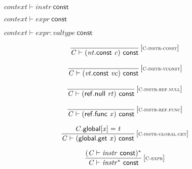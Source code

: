 \vspace{1ex}

$\boxed{{\mathit{context}} \vdash {\mathit{instr}}~\mathsf{const}}$

$\boxed{{\mathit{context}} \vdash {\mathit{expr}}~\mathsf{const}}$

$\boxed{{\mathit{context}} \vdash {\mathit{expr}} : {\mathit{valtype}}~\mathsf{const}}$

$$
\begin{array}{@{}c@{}}\displaystyle
\frac{
}{
{\mathit{C}} \vdash ({\mathit{nt}}.\mathsf{const}~{\mathit{c}})~\mathsf{const}
} \, {[\textsc{\scriptsize C{-}instr{-}const}]}
\qquad
\end{array}
$$

$$
\begin{array}{@{}c@{}}\displaystyle
\frac{
}{
{\mathit{C}} \vdash ({\mathit{vt}}.\mathsf{const}~{\mathit{vc}})~\mathsf{const}
} \, {[\textsc{\scriptsize C{-}instr{-}vconst}]}
\qquad
\end{array}
$$

$$
\begin{array}{@{}c@{}}\displaystyle
\frac{
}{
{\mathit{C}} \vdash (\mathsf{ref.null}~{\mathit{rt}})~\mathsf{const}
} \, {[\textsc{\scriptsize C{-}instr{-}ref.null}]}
\qquad
\end{array}
$$

$$
\begin{array}{@{}c@{}}\displaystyle
\frac{
}{
{\mathit{C}} \vdash (\mathsf{ref.func}~{\mathit{x}})~\mathsf{const}
} \, {[\textsc{\scriptsize C{-}instr{-}ref.func}]}
\qquad
\end{array}
$$

$$
\begin{array}{@{}c@{}}\displaystyle
\frac{
{\mathit{C}}.\mathsf{global}{}[{\mathit{x}}] = {\mathit{t}}
}{
{\mathit{C}} \vdash (\mathsf{global.get}~{\mathit{x}})~\mathsf{const}
} \, {[\textsc{\scriptsize C{-}instr{-}global.get}]}
\qquad
\end{array}
$$

\vspace{1ex}

$$
\begin{array}{@{}c@{}}\displaystyle
\frac{
({\mathit{C}} \vdash {\mathit{instr}}~\mathsf{const})^\ast
}{
{\mathit{C}} \vdash {{\mathit{instr}}^\ast}~\mathsf{const}
} \, {[\textsc{\scriptsize C{-}expr}]}
\qquad
\end{array}
$$

\vspace{1ex}

